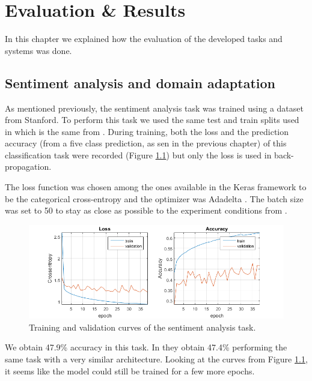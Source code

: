 \chapter{Evaluation \& Results}

In this chapter we explained how the evaluation of the developed tasks and systems was done.

\section{Sentiment analysis and domain adaptation}

As mentioned previously, the sentiment analysis task was trained using a dataset from Stanford. To perform this task we used the same test and train splits used in \cite{socher2013recursive} which is the same from \cite{DBLP:journals/corr/Kim14f}. During training, both the loss and the prediction accuracy (from a five class prediction, as sen in the previous chapter) of this classification task were recorded (Figure \ref{fig:sa-eval}) but only the loss is used in back-propagation.

The loss function was chosen among the ones available in the Keras framework to be the categorical cross-entropy \cite{golik2013cross} and the optimizer was Adadelta \cite{zeiler2012adadelta}. The batch size was set to 50 to stay as close as possible to the experiment conditions from \cite{DBLP:journals/corr/Kim14f}.

\begin{figure}[h]
    \centering
    \includegraphics[width=16cm]{figures/sa}
    \caption{Training and validation curves of the sentiment analysis task.}
    \label{fig:sa-eval}
\end{figure}

We obtain 47.9\% accuracy in this task. In \cite{DBLP:journals/corr/Kim14f} they obtain 47.4\% performing the same task with a very similar architecture. Looking at the curves from Figure \ref{fig:sa-eval}, it seems like the model could still be trained for a few more epochs.

